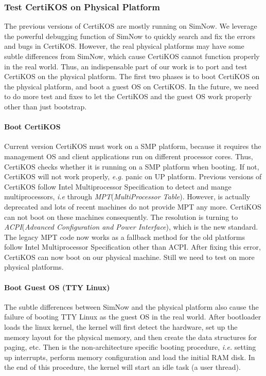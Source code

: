 \documentclass[a4paper,12pt]{article}
\begin{document}
\subsubsection{Test CertiKOS on Physical Platform}
The previous versions of CertiKOS are mostly running on SimNow. We leverage the powerful debugging function of SimNow to quickly search and fix the errors and bugs in CertiKOS. However, the real physical platforms may have some subtle differences from SimNow, which cause CertiKOS cannot function properly in the real world. Thus, an indispensable part of our work is to port and test CertiKOS on the physical platform. The first two phases is to boot CertiKOS on the physical platform, and boot a guest OS on CertiKOS. In the future, we need to do more test and fixes to let the CertiKOS and the guest OS work properly other than just bootstrap.

\paragraph{Boot CertiKOS}
Current version CertiKOS must work on a SMP platform, because it requires the management OS and client applications run on different processor cores. Thus, CertiKOS checks whether it is running on a SMP platform when booting. If not, CertiKOS will not work properly, {\it e.g.} panic on UP platform. Previous versions of CertiKOS follow Intel Multiprocessor Specification\cite{MP} to detect and mange multiprocessors, {\it i.e} through {\it MPT}({\it MultiProcessor Table}). However, \cite{MP} is actually deprecated and lots of recent machines do not provide MPT any more. CertiKOS can not boot on these machines consequently. The resolution is turning to {\it ACPI}({\it Advanced Configuration and Power Interface}), which is the new standard. The legacy MPT code now works as a fallback method for the old platforms follow Intel Multiprocessor Specification other than ACPI. After fixing this error, CertiKOS can now boot on our physical machine. Still we need to test on more physical platforms.

\paragraph{Boot Guest OS (TTY Linux)}
The subtle differences between SimNow and the physical platform also cause the failure of booting TTY Linux as the guest OS in the real world. After bootloader loads the linux kernel, the kernel will first detect the hardware, set up the memory layout for the physical memory, and then create the data structures for paging, etc. Then is the non-architecture specific booting procedure, {\it i.e.} setting up interrupts, perform memory configuration and load the initial RAM disk. In the end of this procedure, the kernel will start an idle task (a user thread).
\end{document}
